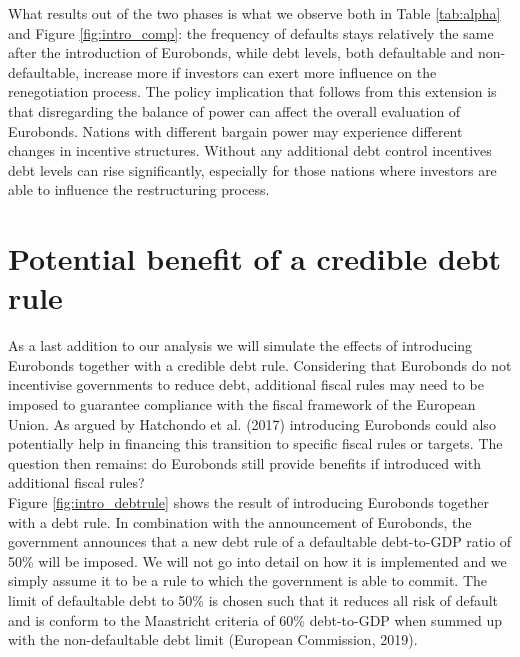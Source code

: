 What results out of the two phases is what we observe both in Table \ref{tab:alpha} and Figure \ref{fig:intro_comp}: the frequency of defaults stays relatively the same after the introduction of Eurobonds, while debt levels, both defaultable and non-defaultable, increase more if investors can exert more influence on the renegotiation process. The policy implication that follows from this extension is that disregarding the balance of power can affect the overall evaluation of Eurobonds. Nations with different bargain power may experience different changes in incentive structures. Without any additional debt control incentives debt levels can rise significantly, especially for those nations where investors are able to influence the restructuring process.\\

\section{Potential benefit of a credible debt rule}
As a last addition to our analysis we will simulate the effects of introducing Eurobonds together with a credible debt rule. Considering that Eurobonds do not incentivise governments to reduce debt, additional fiscal rules may need to be imposed to guarantee compliance with the fiscal framework of the European Union. As argued by Hatchondo et al. (2017) introducing Eurobonds could also potentially help in financing this transition to specific fiscal rules or targets. The question then remains: do Eurobonds still provide benefits if introduced with additional fiscal rules?\\

Figure \ref{fig:intro_debtrule} shows the result of introducing Eurobonds together with a debt rule. In combination with the announcement of Eurobonds, the government announces that a new debt rule of a defaultable debt-to-GDP ratio of 50\% will be imposed. We will not go into detail on how it is implemented and we simply assume it to be a rule to which the government is able to commit. The limit of defaultable debt to 50\% is chosen such that it reduces all risk of default and is conform to the Maastricht criteria of 60\% debt-to-GDP when summed up with the non-defaultable debt limit (European Commission, 2019).\\

